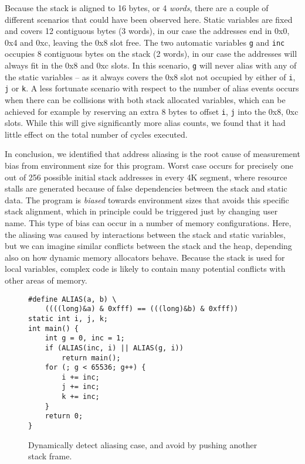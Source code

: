 \documentclass[prodmode,acmtaco]{acmsmall}
\begin{document}
Because the stack is aligned to 16 bytes, or 4 \emph{words}, there are a couple of different scenarios that could have been observed here.
Static variables are fixed and covers 12 contiguous bytes (3 words), in our case the addresses end in 0x0, 0x4 and 0xc, leaving the 0x8 slot free.
The two automatic variables \texttt{g} and \texttt{inc} occupies 8 contiguous bytes on the stack (2 words), in our case the addresses will always fit in the 0x8 and 0xc slots.
In this scenario, \texttt{g} will never alias with any of the static variables -- as it always covers the 0x8 slot not occupied by either of \texttt{i}, \texttt{j} or \texttt{k}.
A less fortunate scenario with respect to the number of alias events occurs when there can be collisions with both stack allocated variables, which can be achieved for example by reserving an extra 8 bytes to offset \texttt{i}, \texttt{j} into the 0x8, 0xc slots. 
While this will give significantly more alias counts, we found that it had little effect on the total number of cycles executed.

In conclusion, we identified that address aliasing is the root cause of measurement bias from environment size for this program.
Worst case occurs for precisely one out of 256 possible initial stack addresses in every 4K segment, where resource stalls are generated because of false dependencies between the stack and static data.
The program is \emph{biased} towards environment sizes that avoids this specific stack alignment, which in principle could be triggered just by changing user name.
This type of bias can occur in a number of memory configurations.
Here, the aliasing was caused by interactions between the stack and static variables, but we can imagine similar conflicts between the stack and the heap, depending also on how dynamic memory allocators behave.
Because the stack is used for local variables, complex code is likely to contain many potential conflicts with other areas of memory.

\begin{figure}
  \begin{lstlisting}[frame=single, xleftmargin=.1\textwidth, xrightmargin=.1\textwidth]
#define ALIAS(a, b) \
    ((((long)&a) & 0xfff) == (((long)&b) & 0xfff))
static int i, j, k;
int main() {
    int g = 0, inc = 1;
    if (ALIAS(inc, i) || ALIAS(g, i))
        return main();
    for (; g < 65536; g++) {
        i += inc;
        j += inc;
        k += inc;
    }
    return 0;
}
  \end{lstlisting}
  \caption{Dynamically detect aliasing case, and avoid by pushing another stack frame.}
  \label{lst:loopfixed}
\end{figure}
\end{document}
